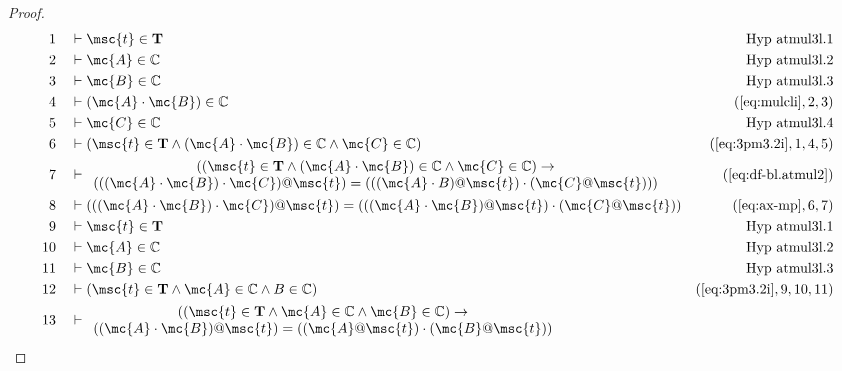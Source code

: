 \begin{proof}
\begin{align}
  1 &&  & \vdash \msc{t} \in \mathbf{T}&\text{Hyp~atmul3l.1}\notag%
  \\ 2 &&  & \vdash \mc{A} \in \mathbb{C}&\text{Hyp~atmul3l.2}\notag%
  \\ 3 &&  & \vdash \mc{B} \in \mathbb{C}&\text{Hyp~atmul3l.3}\notag%
  \\ 4 &&  & \vdash ( \mc{A} \cdot \mc{B} ) \in
     \mathbb{C}&(\mbox{\ref{eq:mulcli}},2,3)\notag
  \\ 5 &&  & \vdash \mc{C} \in \mathbb{C}&\text{Hyp~atmul3l.4}\notag%
  \\ 6 &&  & \vdash ( \msc{t} \in \mathbf{T} \wedge ( \mc{A} \cdot \mc{B} ) \in
     \mathbb{C} \wedge \mc{C} \in \mathbb{C}
     )&(\mbox{\ref{eq:3pm3.2i}},1,4,5)\notag
  \\ 7 &&  & \vdash 
     \begin{array}{c}
     ( ( \msc{t} \in \mathbf{T} \wedge ( \mc{A} \cdot \mc{B} ) \in
     \mathbb{C} \wedge \mc{C} \in \mathbb{C} ) \rightarrow \\
     ( (
     ( \mc{A} \cdot \mc{B} ) \cdot \mc{C} ) @ \msc{t} ) = ( ( ( \mc{A} \cdot B
     ) @ \msc{t} ) \cdot ( \mc{C} @ \msc{t} ) )
     )
     \end{array}
     &(\mbox{\ref{eq:df-bl.atmul2}})\notag
  \\ 8 &&  & \vdash ( ( ( \mc{A} \cdot \mc{B} ) \cdot \mc{C} ) @ \msc{t} ) = ( ( ( \mc{A} \cdot \mc{B} )
     @ \msc{t} ) \cdot ( \mc{C} @ \msc{t} )
     )&(\mbox{\ref{eq:ax-mp}},6,7)\notag
  \\ 9 &&  & \vdash \msc{t} \in
     \mathbf{T}&\text{Hyp~atmul3l.1}\notag%
  \\ 10 &&  & \vdash \mc{A} \in \mathbb{C}&\text{Hyp~atmul3l.2}\notag%
  \\ 11 &&  & \vdash \mc{B} \in \mathbb{C}&\text{Hyp~atmul3l.3}\notag%
  \\ 12 &&  & \vdash ( \msc{t} \in \mathbf{T} \wedge \mc{A} \in \mathbb{C} \wedge B
     \in \mathbb{C}
     )&(\mbox{\ref{eq:3pm3.2i}},9,10,11)\notag
  \\ 13 &&  & \vdash 
     \begin{array}{c}
     ( ( \msc{t} \in \mathbf{T} \wedge \mc{A} \in \mathbb{C} \wedge
     \mc{B} \in \mathbb{C} ) \rightarrow \\
      ( ( \mc{A} \cdot \mc{B} ) @
     \msc{t} ) = ( ( \mc{A} @ \msc{t} ) \cdot ( \mc{B} @ \msc{t} ) )

\end{array}
\end{align}
\end{proof}
